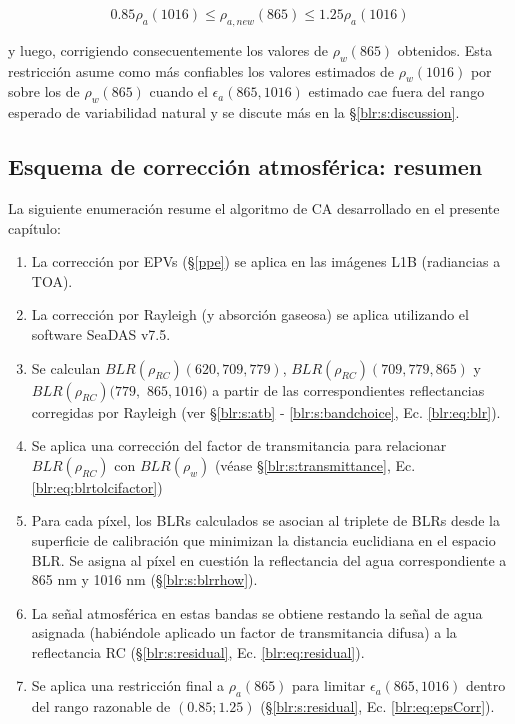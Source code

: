         \begin{equation}
            0.85\rho_{a}(1016) \leq \rho_{a,new}(865) \leq 1.25\rho_{a}(1016)
            \label{blr:eq:epsCorr}
        \end{equation}

        y luego, corrigiendo consecuentemente los valores de $\rho_{w}(865)$ obtenidos. Esta restricción asume como más confiables los valores estimados de $\rho_{w}(1016)$ por sobre los de $\rho_{w}(865)$ cuando el $\epsilon_{a}(865,1016)$ estimado cae fuera del rango esperado de variabilidad natural y se discute más en la \S \ref{blr:s:discussion}.

    \subsection{Esquema de corrección atmosférica: resumen}
    \label{blr:s:summary}

    La siguiente enumeración resume el algoritmo de CA desarrollado en el presente capítulo:
    
    \begin{enumerate}
        \item La corrección por EPVs (\S \ref{ppe}) se aplica en las imágenes L1B (radiancias a TOA).
        \item La corrección por Rayleigh (y absorción gaseosa) se aplica utilizando el software SeaDAS v7.5.
        \item Se calculan $BLR(\rho_{RC})(620,709,779)$, $BLR(\rho_{RC})(709,779,865)$ y $BLR(\rho_{RC})(779,$ $865,1016)$ a partir de las correspondientes reflectancias corregidas por Rayleigh (ver \S \ref{blr:s:atb} - \ref{blr:s:bandchoice}, Ec. \ref{blr:eq:blr}).
        \item Se aplica una corrección del factor de transmitancia para relacionar $BLR(\rho_{RC})$ con $BLR(\rho_{w})$ (véase \S \ref{blr:s:transmittance}, Ec. \ref{blr:eq:blrtolcifactor})
        \item Para cada píxel, los BLRs calculados se asocian al triplete de BLRs desde la superficie de calibración que minimizan la distancia euclidiana en el espacio BLR. Se asigna al píxel en cuestión la reflectancia del agua correspondiente a 865 nm y 1016 nm (\S \ref{blr:s:blrrhow}).
        \item La señal atmosférica en estas bandas se obtiene restando la señal de agua asignada (habiéndole aplicado un factor de transmitancia difusa) a la reflectancia RC (\S \ref{blr:s:residual}, Ec. \ref{blr:eq:residual}).
        \item Se aplica una restricción final a $\rho_{a}(865)$ para limitar $\epsilon_{a}(865,1016)$ dentro del rango razonable de $(0.85; 1.25)$ (\S \ref{blr:s:residual}, Ec. \ref{blr:eq:epsCorr}).
    \end{enumerate}
    
